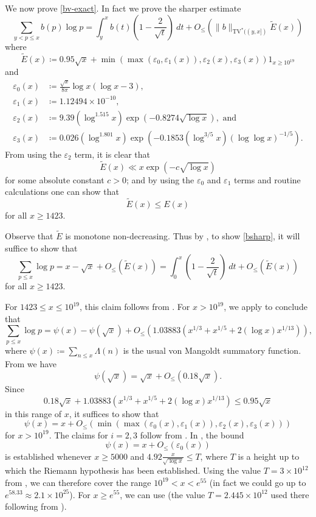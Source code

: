 \documentclass[10pt,a4paper,reqno]{amsart}
\numberwithin{equation}{section}
\theoremstyle{plain}
\theoremstyle{definition}
\newcommand\eps{\varepsilon}
\begin{document}
We now prove \eqref{bv-exact}. In fact we prove the sharper estimate
\begin{equation}\label{bsharp}  
  \sum_{y < p \leq x} b(p) \log p = \int_y^x b(t) \left(1 - \frac{2}{\sqrt{t}}\right) \ dt
+ O_\leq\left(\|b\|_{\mathrm{TV}^*((y,x])} \tilde E(x) \right)
\end{equation}
where
\begin{equation}\label{etil-def}
\tilde E(x) \coloneqq 0.95 \sqrt{x} + \min( \max(\eps_0,\eps_1(x)), \eps_2(x), \eps_3(x)) 1_{x \geq 10^{19}}
\end{equation}
and
\begin{align*}
  \eps_0(x) &\coloneqq \frac{\sqrt{x}}{8\pi} \log x(\log x - 3),\\
  \eps_1(x) &\coloneqq 1.12494 \times 10^{-10},\\
  \eps_2(x) &\coloneqq 9.39 (\log^{1.515} x) \exp(-0.8274\sqrt{\log x}),\text{ and}\\
  \eps_3(x) &\coloneqq 0.026 (\log^{1.801} x) \exp(-0.1853 (\log^{3/5} x) (\log\log x)^{-1/5}).
\end{align*}
From using the $\eps_2$ term, it is clear that
$$ \tilde E(x) \ll x \exp(-c \sqrt{\log x})$$
for some absolute constant $c>0$; and by using the $\eps_0$ and $\eps_1$ terms and routine calculations one can show that
$$ \tilde E(x) \leq E(x)$$
for all $x \geq 1423$.

Observe that $\tilde E$ is monotone non-decreasing. Thus by , to show \eqref{bsharp}, it will suffice to show that
$$ \sum_{p \leq x} \log p = x - \sqrt{x} + O_{\leq}(\tilde E(x))
  = \int_0^x \left(1-\frac{2}{\sqrt{t}}\right)\ dt + O_{\leq}(\tilde E(x))$$
for all $x \geq 1423$.

For $1423 \leq x \leq 10^{19}$, this claim follows from \cite[Theorem 2]{buthe-2}.  For $x > 10^{19}$, we apply \cite[(6.10), (6.11)]{buthe} to conclude that
$$
\sum_{p \leq x} \log p = \psi(x) - \psi(\sqrt{x}) + O_{\leq}(1.03883 (x^{1/3} + x^{1/5} + 2 (\log x) x^{1/13})),$$
where $\psi(x) \coloneqq \sum_{n \leq x} 
\Lambda(n)$ is the usual von Mangoldt summatory function.  
From \cite[Theorems 10,12]{rs} we have
$$ \psi(\sqrt{x}) = \sqrt{x} + O_{\leq}(0.18 \sqrt{x}).$$
Since
$$ 0.18 \sqrt{x} + 1.03883 (x^{1/3} + x^{1/5} + 2 (\log x) x^{1/13}) \leq 0.95 \sqrt{x}$$
in this range of $x$, it suffices to show that
$$ \psi(x) = x + O_{\leq}(\min( \max(\eps_0(x),\eps_1(x)), \eps_2(x), \eps_3(x)) )$$
for $x > 10^{19}$.  The claims for $i=2,3$ follow from \cite[Theorems 1.1, 1.4]{johnston-yang}.  In \cite[Theorem 2, (7.3)]{buthe}, the bound
$$ \psi(x) = x + O_{\leq}(\eps_0(x))$$
is established whenever $x \geq 5000$ and $4.92 \frac{x}{\sqrt{\log x}} \leq T$, where $T$ is a height up to which the Riemann hypothesis has been established.  Using the value $T = 3 \times 10^{12}$ from \cite{platt-rh}, we can therefore cover the range $10^{19} < x < e^{55}$ (in fact we could go up to $e^{58.33} \approx 2.1 \times 10^{25}$).  For $x \geq e^{55}$, we can use \cite[Table 2]{buthe} (the value $T = 2.445 \times 10^{12}$ used there following from \cite{platt-rh}).
\end{document}
